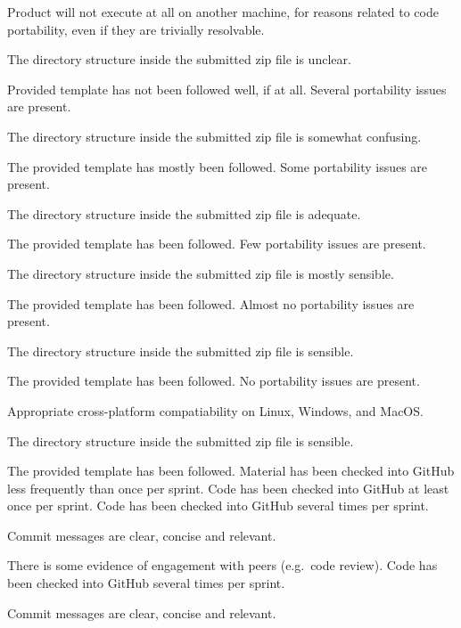 \documentclass{../../fal_assignment}
\begin{document}
\begin{markingrubric}
%
        \grade\fail Product will not execute at all on another machine, for reasons related to code portability, even if they are trivially resolvable.
            \par The directory structure inside the submitted zip file is unclear.
            \par Provided template has not been followed well, if at all.
        \grade Several portability issues are present.
            \par The directory structure inside the submitted zip file is somewhat confusing.
            \par The provided template has mostly been followed.
        \grade Some portability issues are present.
            \par The directory structure inside the submitted zip file is adequate.
            \par The provided template has been followed.
        \grade Few portability issues are present.
            \par The directory structure inside the submitted zip file is mostly sensible.
            \par The provided template has been followed.
        \grade Almost no portability issues are present.
            \par The directory structure inside the submitted zip file is sensible.
            \par The provided template has been followed.
        \grade No portability issues are present.
            \par Appropriate cross-platform compatiability on Linux, Windows, and MacOS.
            \par The directory structure inside the submitted zip file is sensible.
            \par The provided template has been followed.
%
        \grade \fail Material has been checked into GitHub less frequently than once per sprint.
        \grade Code has been checked into GitHub at least once per sprint.
        \grade Code has been checked into GitHub several times per sprint.
            \par Commit messages are clear, concise and relevant.
            \par There is some evidence of engagement with peers (e.g.\ code review).
        \grade Code has been checked into GitHub several times per sprint.
            \par Commit messages are clear, concise and relevant.

\end{markingrubric}
\end{document}
